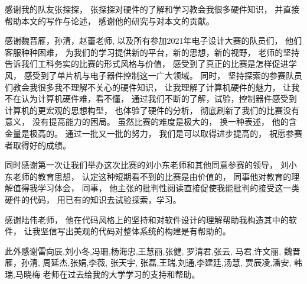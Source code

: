 \documentclass[../main.tex]{subfiles}
\begin{document}
感谢我的队友张探探，
张探探对硬件的了解和学习教会我很多硬件知识，
并直接帮助本文的写作与论述，
感谢他的研究与对本文的贡献。

感谢魏晋雁，孙清，赵蕾老师,
以及所有参加2021年电子设计大赛的队员们，
他们客服种种困难，
为我们的学习提供新的平台，新的思想，新的视野，
老师的坚持告诉我们工科务实的比赛的形式风格与价值，
感受到了真正的比赛是怎样促进学风，
感受到了单片机与电子器件控制这一广大领域。
同时，
坚持探索的参赛队员们教会我很多我不理解不关心的硬件知识，
让我理解了计算机硬件的魅力，
让我不在认为计算机硬件难，看不懂，
通过我们不断的了解，试验，控制器件感受到计算机的更宏观的思想构型，
也体验了硬件的分析，
彻底刷新了我们的比赛没有意义，
没有提高能力的困局。
虽然比赛的难度是极大的，
换一种表述，
他的含金量是极高的。
通过一批又一批的努力，
我们是可以取得进步提高的，
祝愿参赛者取得好的成绩。

同时感谢第一次让我们举办这次比赛的刘小东老师和其他同意参赛的领导，
刘小东老师的教育思想，
认定这种短期看不到的比赛是由价值的，
同事他对教育的理解值得我学习体会，
同事，
他主张的批判性阅读直接促使我能批判的接受这一类硬件的代码，
用已有的知识去试验探索，学习。

感谢陆伟老师，
他在代码风格上的坚持和对软件设计的理解帮助我构造其中的软件，
让我坚信写出美观的代码对整体系统的构建是有帮助的。

此外感谢雷向辰,刘小冬,冯珊,杨海忠,王慧丽,张健,
罗清君,张云,
马君,许文丽,
魏晋雁，孙清,
周延杰,张娟,李薇,
张天宇, 张磊,王瑞,刘通,李建廷,汤慧,
贾辰凌,潘安,
韩瑞,马晓梅%
老师在过去给我的大学学习的支持和帮助。
\end{document}

